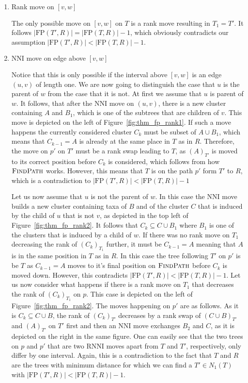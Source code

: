 \documentclass{amsart}
\newcommand{\rnni}{\mathrm{RNNI}}
\newcommand{\findpath}{\textsc{FindPath}}
\newcommand{\nni}{\mathrm{NNI}}
\newcommand{\fp}{\mathrm{FP}}
\begin{document}
\begin{enumerate}
\item Rank move on $[v,w]$

The only possible move on $[v,w]$ on $T$ is a rank move resulting in $T_1 = T'$.
It follows $|\fp(T',R)| = |\fp(T,R)| - 1$, which obviously contradicts our assumption $|\fp(T',R)| < |\fp(T,R)| - 1$.

\item $\nni$ move on edge above $[v,w]$

Notice that this is only possible if the interval above $[v,w]$ is an edge $(u,v)$ of length one.
We are now going to distinguish the case that $u$ is the parent of $w$ from the case that it is not.
At first we assume that $u$ is parent of $w$.
It follows, that after the $\nni$ move on $(u,v)$, there is a new cluster containing $A$ and $B_1$, which is one of the subtrees that are children of $v$.
This move is depicted on the left of Figure~\ref{fig:thm_fp_rank1}.
If such a move happens the currently considered cluster $C_k$ must be subset of $A \cup B_1$, which means that $C_{k-1} = A$ is already at the same place in $T$ as in $R$.
Therefore, the move on $p'$ on $T'$ must be a rank swap leading to $T$, as $(A)_{T'}$ is moved to its correct position before $C_k$ is considered, which follows from how $\findpath$ works.
However, this means that $T$ is on the path $p'$ form $T'$ to $R$, which is a contradiction to $|\fp(T',R)| < |\fp(T,R)| - 1$

Let us now assume that $u$ is not the parent of $w$.
In this case the $\nni$ move builds a new cluster containing taxa of $B$ and of the cluster $C$ that is induced by the child of $u$ that is not $v$, as depicted in the top left of Figure~\ref{fig:thm_fp_rank2}.
It follows that $C_k \subseteq C \cup B_1$ where $B_1$ is one of the clusters that is induced by a child of $w$.
If there was no rank move on $T_1$ decreasing the rank of $(C_k)_{T_1}$ further, it must be $C_{k-1} = A$ meaning that $A$ is in the same position in $T$ as in $R$.
In this case the tree following $T'$ on $p'$ is be $T$ as $C_{k-1} = A$ moves to it's final position on $\findpath$ before $C_k$ is moved down.
However, this contradicts $|\fp(T',R)| < |\fp(T,R)| - 1$.
Let us now consider what happens if there is a rank move on $T_1$ that decreases the rank of $(C_k)_{T_1}$ on $p$.
This case is depicted on the left of Figure~\ref{fig:thm_fp_rank2}.
The moves happening on $p'$ are as follows.
As it is $C_k \subseteq C \cup B$, the rank of $(C_k)_{T'}$ decreases by a rank swap of $(C \cup B)_{T'}$ and $(A)_{T'}$ on $T'$ first and then an $\nni$ move exchanges $B_2$ and $C$, as it is depicted on the right in the same figure.
One can easily see that the two trees on $p$ and $p'$ that are two $\rnni$ moves apart from $T$ and $T'$, respectively, only differ by one interval.
Again, this is a contradiction to the fact that $T$ and $R$ are the trees with minimum distance for which we can find a $T' \in N_1(T)$ with $|\fp(T',R)| < |\fp(T,R)| - 1$.


\end{enumerate}
\end{document}
